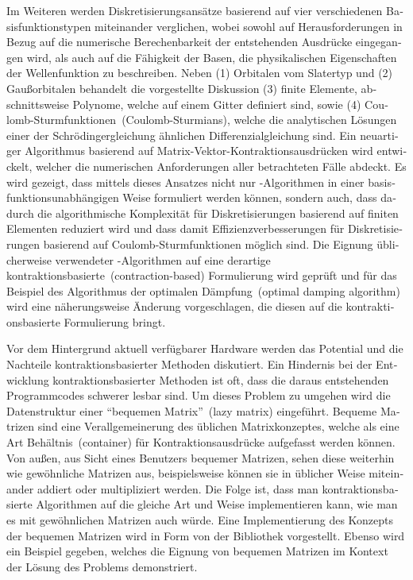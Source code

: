 \begin{otherlanguage}{ngerman}
Im Weiteren werden Diskretisierungsansätze basierend auf vier verschiedenen
Basisfunktionstypen miteinander verglichen,
wobei sowohl auf Herausforderungen in Bezug auf die numerische Berechenbarkeit
der entstehenden Ausdrücke
eingegangen wird,
als auch auf die Fähigkeit der Basen,
die physikalischen Eigenschaften der Wellenfunktion zu beschreiben.
Neben (1) Orbitalen vom Slatertyp und (2) Gaußorbitalen
behandelt die vorgestellte Diskussion
(3) finite Elemente,
abschnittsweise Polynome, welche auf einem Gitter definiert sind,
sowie (4) Coulomb-Sturmfunktionen~(Coulomb-Sturmians),
welche die analytischen Lösungen einer der Schrödingergleichung
ähnlichen Differenzialgleichung sind.
Ein neuartiger Algorithmus basierend auf Matrix-Vektor-Kontraktionsausdrücken
wird entwickelt,
welcher die numerischen Anforderungen aller betrachteten Fälle abdeckt.
Es wird gezeigt, dass mittels dieses Ansatzes
nicht nur \SCF-Algorithmen in einer basisfunktionsunabhängigen Weise
formuliert werden können, sondern auch,
dass dadurch die algorithmische Komplexität
für Diskretisierungen basierend auf finiten Elementen reduziert wird
und dass damit
Effizienzverbesserungen
für Diskretisierungen basierend auf Coulomb-Sturmfunktionen
möglich sind.
Die Eignung üblicherweise verwendeter \SCF-Algorithmen
auf eine derartige kontraktionsbasierte~(contraction-based)
Formulierung wird geprüft
und für das Beispiel des Algorithmus der optimalen Dämpfung~(optimal damping algorithm)
wird eine näherungsweise Änderung vorgeschlagen,
die diesen auf die kontraktionsbasierte Formulierung bringt.

Vor dem Hintergrund aktuell verfügbarer Hardware werden das Potential
und die Nachteile kontraktionsbasierter Methoden diskutiert.
Ein Hindernis bei der Entwicklung kontraktionsbasierter Methoden
ist oft, dass die daraus entstehenden Programmcodes
schwerer lesbar sind.
Um dieses Problem zu umgehen wird die Datenstruktur
einer ``bequemen Matrix''~(lazy matrix) eingeführt.
Bequeme Matrizen sind eine Verallgemeinerung des üblichen Matrixkonzeptes,
welche als eine Art Behältnis~(container) für Kontraktionsausdrücke aufgefasst
werden können.
Von außen, aus Sicht eines Benutzers bequemer Matrizen,
sehen diese weiterhin wie gewöhnliche Matrizen aus,
beispielsweise können sie in üblicher Weise
miteinander addiert oder multipliziert werden.
Die Folge ist,
dass man kontraktionsbasierte Algorithmen auf die gleiche Art und Weise
implementieren kann,
wie man es mit gewöhnlichen Matrizen auch würde.
Eine Implementierung des Konzepts der bequemen Matrizen
wird in Form von der Bibliothek \lazyten vorgestellt.
Ebenso wird ein Beispiel gegeben,
welches die Eignung von bequemen Matrizen im Kontext der
Lösung des \HF Problems demonstriert.


\end{otherlanguage}
